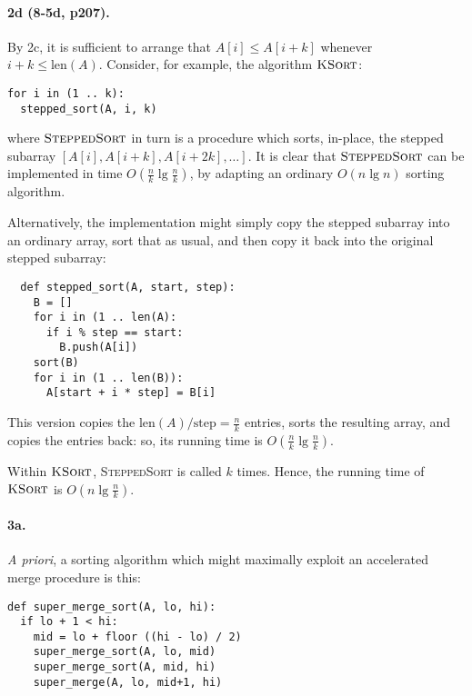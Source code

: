 \documentclass[
]{article}
\begin{document}
\paragraph{2d (8-5d, p207).} 
By 2c, it is sufficient to arrange that $A[i]\leq A[i+k]$ whenever $i+k\leq \text{len}(A)$.  Consider, for example, the algorithm $\textsc{KSort}$:
\begin{verbatim}
for i in (1 .. k):
  stepped_sort(A, i, k)
\end{verbatim}
where $\textsc{SteppedSort}$ in turn is a procedure which sorts, in-place, the stepped subarray $[A[i], A[i+k], A[i+2k], \ldots]$.  It is clear that $\textsc{SteppedSort}$ can be implemented in time $O(\frac{n}{k}\lg\frac{n}{k})$, by adapting an ordinary $O(n\lg n)$ sorting algorithm. 


Alternatively, the implementation might simply copy the stepped subarray into an ordinary array, sort that as usual, and then copy it back into the original stepped subarray:
\begin{verbatim}
  def stepped_sort(A, start, step):
    B = []
    for i in (1 .. len(A):
      if i % step == start:
        B.push(A[i])
    sort(B)
    for i in (1 .. len(B)):
      A[start + i * step] = B[i]
\end{verbatim}
This version copies the $\text{len}(A)/\text{step} = \frac{n}{k}$ entries, sorts the resulting array, and copies the entries back: so, its running time is 
$O(\frac{n}{k}\lg\frac{n}{k})$.

Within $\textsc{KSort}$, \textsc{SteppedSort} is called $k$ times.  Hence, the running time of $\textsc{KSort}$ is $O(n\lg\frac{n}{k})$.



\paragraph{3a.} \emph{A priori}, a sorting algorithm which might maximally exploit an accelerated merge procedure is this:
\begin{verbatim}
def super_merge_sort(A, lo, hi):
  if lo + 1 < hi:
    mid = lo + floor ((hi - lo) / 2)
    super_merge_sort(A, lo, mid)
    super_merge_sort(A, mid, hi)
    super_merge(A, lo, mid+1, hi)
\end{verbatim}
\end{document}
